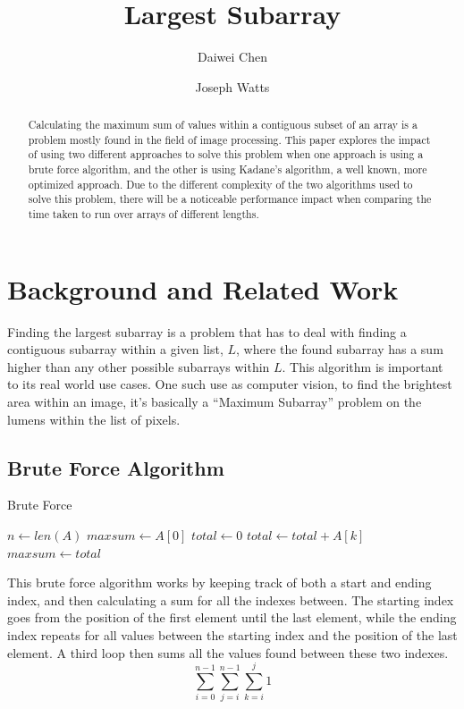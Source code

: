 \documentclass[10pt, letterpaper]{article}
\title{Largest Subarray}
\author{Daiwei Chen \and Joseph Watts}
\begin{document}
	\maketitle
	\begin{abstract}
		Calculating the maximum sum of values within a contiguous subset of an array is a problem mostly found in the field of image processing.
		This paper explores the impact of using two different approaches to solve this problem when one approach is using a brute force algorithm, and the other is using Kadane's algorithm, a well known, more optimized approach.
		Due to the different complexity of the two algorithms used to solve this problem,
		there will be a noticeable performance impact when comparing the time taken to run over arrays of different lengths.
	\end{abstract}

	\section{Background and Related Work}
  Finding the largest subarray is a problem that has to deal with finding a contiguous subarray within a given list, $L$, where the found subarray has a sum higher than any other possible subarrays within $L$.
  This algorithm is important to its real world use cases. One such use as computer vision, to find the brightest area within an image, it's basically a ``Maximum Subarray'' problem on the lumens within the list of pixels.

	\subsection{Brute Force Algorithm}

	\begin{algorithm}
	\begin{algorithmic}
		\caption{Brute Force}\label{bruteforce}
	\State $n\gets len(A)$
	\State $maxsum\gets A[0]$
	\State $total\gets 0$
	\State $total\gets total + A[k]$
	\EndFor
	\State $maxsum\gets total$
	\EndIf
	\EndFor
	\EndFor
	\EndFunction
	\end{algorithmic}
	\end{algorithm}


	This brute force algorithm works by keeping track of both a start and ending index, and then calculating a sum for all the indexes between.
	The starting index goes from the position of the first element until the last element, while the ending index repeats for all values between the starting index and the position of the last element.
	A third loop then sums all the values found between these two indexes.
	\[\sum_{i = 0}^{n-1}\sum_{j = i}^{n-1}\sum_{k = i}^{j}1\]
\end{document}
